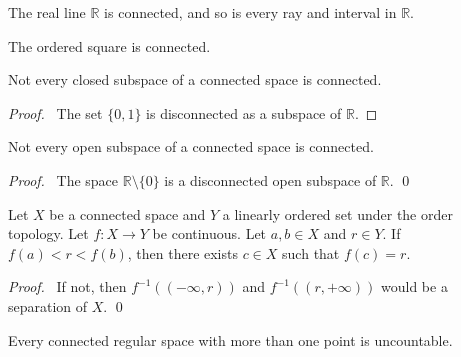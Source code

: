 \begin{cor}
  \label{cor:connected:real}
  The real line $\mathbb{R}$ is connected, and so is every ray and interval
  in $\mathbb{R}$.
\end{cor}

\begin{cor}
  The ordered square is connected.
\end{cor}

\begin{cor}
Not every closed subspace of a connected space is connected.
\end{cor}

\begin{proof}
\pf\ The set $\{0,1\}$ is disconnected as a subspace of $\mathbb{R}$.
\end{proof}

\begin{cor}
Not every open subspace of a connected space is connected.
\end{cor}

\begin{proof}
\pf\ The space $\mathbb{R} \setminus \{ 0 \}$ is a disconnected open subspace of $\mathbb{R}$.
\qed
\end{proof}

\begin{thm}
  Let $X$ be a connected space and $Y$ a linearly ordered set under the order
  topology. Let $f : X \rightarrow Y$ be continuous. Let $a, b \in X$ and $r
  \in Y$. If $f(a) < r < f(b)$, then there exists $c \in X$ such that $f(c) =
  r$.
\end{thm}

\begin{proof}
  \pf\ If not, then $f^{-1}((- \infty, r))$ and $f^{-1}((r, + \infty))$ would
  be a separation of $X$. \qed
\end{proof}

 \begin{prop}
 Every connected regular space with more than one point is uncountable.
\end{prop}

